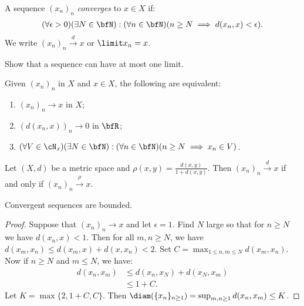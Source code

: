     \begin{definition}

        A sequence $(x_n)_n$ \textit{converges} to $x \in X$ if:
            \begin{equation*}
            \begin{split}
                (\forall \epsilon > 0)(\exists N \in \bfN):(\forall n \in \bfN)(n \geq N \implies d(x_n,x) < \epsilon).
            \end{split}
            \end{equation*}
        We write $(x_n)_n \xrightarrow{d} x$ or $\limit x_n = x$.
    \end{definition}

    \begin{exercise}
        Show that a sequence can have at most one limit.
    \end{exercise}

    \begin{proposition}
        Given $(x_n)_n$ in $X$ and $x \in X$, the following are equivalent:
        \begin{enumerate}[label = (\arabic*),itemsep=1pt,topsep=3pt]
            \item $(x_n)_n \rightarrow x$ in $X$;
            \item $(d(x_n,x))_n \rightarrow 0$ in $\bfR$;
            \item $(\forall V \in \cN_x)(\exists N \in \bfN):(\forall n\in \bfN)(n \geq N \implies x_n \in V)$. 
        \end{enumerate}
    \end{proposition}

    \begin{exercise}
        Let $(X,d)$ be a metric space and $\rho(x,y) = \frac{d(x,y)}{1 + d(x,y)}$. Then $(x_n)_n \xrightarrow{d} x$ if and only if $(x_n)_n \xrightarrow{\rho} x$.
    \end{exercise}

    \begin{proposition}
        Convergent sequences are bounded.
    \end{proposition}
        \begin{proof}
            Suppose that $(x_n)_n \rightarrow x$ and let $\epsilon = 1$. Find $N$ large so that for $n \geq N$ we have $d(x_n,x) < 1$. Then for all $m,n \geq N$, we have $d(x_m,x_n) \leq d(x_m,x) + d(x,x_n) < 2$. Set $C = \max_{1 \leq n,m \leq N}d(x_m,x_n)$. Now if $n \geq N$ and $m \leq N$, we have:
                \begin{equation*}
                \begin{split}
                    d(x_n,x_m)
                    & \leq d(x_n,x_N) + d(x_N,x_m) \\
                    & \leq 1 + C.
                \end{split}
                \end{equation*}
            Let $K = \max\{2,1+C,C\}$. Then $\diam(\{x_n\}_{n \geq 1}) = \sup_{m,n \geq 1}d(x_n,x_m) \leq K$.
        \end{proof}

